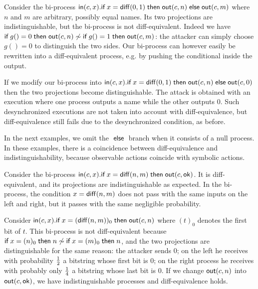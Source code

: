 \begin{example}
  Consider the bi-process
  $\mathsf{in}(c,x).\textsf{if}\; x=\mathsf{diff}(0,1) \;\textsf{then}\; \mathsf{out}(c,n) \;\textsf{else}\; \mathsf{out}(c,m)$
  where $n$ and $m$ are arbitrary, possibly equal names.
  Its two projections are indistinguishable, but the
  bi-process is not diff-equivalent.
  Indeed we have
  $\textsf{if}\; g()=0 \;\textsf{then}\; \mathsf{out}(c,n) \not\sim
  \textsf{if}\; g()=1 \;\textsf{then}\; \mathsf{out}(c,m)$: the attacker can simply choose
  $g()=0$ to distinguish the two sides.
  Our bi-process can however easily be
  rewritten into a diff-equivalent process, e.g. by pushing the conditional
  inside the output.

  If we modify our bi-process into
  $\mathsf{in}(c,x).\textsf{if}\; x=\mathsf{diff}(0,1) \;\textsf{then}\; \mathsf{out}(c,n) \;\textsf{else}\; \mathsf{out}(c,0)$
  then the two projections become distinguishable.
  The attack is obtained with an execution
  where one process outputs a name while the other outputs $0$. Such
  desynchronized executions are not taken into account with diff-equivalence,
  but diff-equivalence still fails due to the desynchronized condition,
  as before.
\end{example}

In the next examples, we omit the $\;\textsf{else}\;$ branch when it consists of a null
process. In these examples, there is a coincidence between diff-equivalence
and indistinguishability, because observable actions coincide with symbolic
actions.

\begin{example} \label{ex:negl}
  Consider the bi-process
  $\mathsf{in}(c,x).\textsf{if}\; x=\mathsf{diff}(n,m) \;\textsf{then}\; \mathsf{out}(c,\mathsf{ok})$.
  It is diff-equivalent, and its projections are
  indistinguishable as expected.
  In the bi-process, the condition $x=\mathsf{diff}(n,m)$ does not pass
  with the same inputs on the left and right, but it passes with
  the same negligible probability.
\end{example}

\begin{example} \label{ex:sync}
  Consider
  $\mathsf{in}(c,x).\textsf{if}\; x=(\mathsf{diff}(n,m))_0 \;\textsf{then}\; \mathsf{out}(c,n)$
  where $(t)_0$ denotes the first bit of $t$.
  This bi-process is not diff-equivalent because
  $\textsf{if}\; x=(n)_0 \;\textsf{then}\; n \not\sim \textsf{if}\; x=(m)_0 \;\textsf{then}\; n$, and
  the two projections are distinguishable for the same
  reason: the attacker sends $0$;
  on the left he receives with probability $1\over 2$ a bitstring whose
  first bit is $0$;
  on the right process he receives with probably only $1\over 4$
  a bitstring whose last bit is $0$.
  If we change $\mathsf{out}(c,n)$ into $\mathsf{out}(c,\mathsf{ok})$,
  we have indistinguishable processes and diff-equivalence holds.
\end{example}

